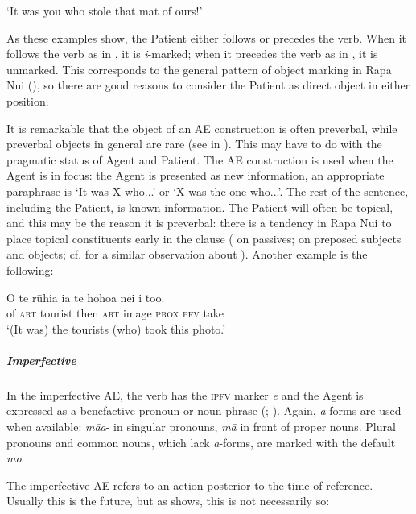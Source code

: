\glt
‘It was you who stole that mat of ours!’ \textstyleExampleref{[R310.428]} 
\z

As these examples show, the Patient either follows or precedes the verb. When it follows the verb as in , it is \textit{i}{}-marked; when it precedes the verb as in , it is unmarked. This corresponds to the general pattern of object marking in Rapa Nui (), so there are good reasons to consider the Patient as direct object in either position.

It is remarkable that the object of an AE construction is often preverbal, while preverbal objects in general are rare (see  in ). This may have to do with the pragmatic status of Agent and Patient. The AE construction is used when the Agent is in focus: the Agent is presented as new information, an appropriate paraphrase is ‘It was X who...’ or ‘X was the one who...’. The rest of the sentence, including the Patient, is known information. The Patient will often be topical, and this may be the reason it is preverbal: there is a tendency in Rapa Nui to place topical constituents early in the clause ( on passives;  on preposed subjects and objects; cf. \citet[68]{PotsdamPolinsky2012} for a similar observation about ). Another example is the following: 

\ea\label{ex:8.98}
\gll O te rūhia ia te hoho{\ꞌ}a nei i to{\ꞌ}o. \\
of \textsc{art} tourist then \textsc{art} image \textsc{prox} \textsc{pfv} take \\

\glt 
‘(It was) the tourists (who) took this photo.’ \textstyleExampleref{[R415.735]} 
\z

\subparagraph{Imperfective} In the imperfective AE, the verb has the \textsc{ipfv} marker \textit{e} and the Agent is expressed as a benefactive pronoun or noun phrase (; ). Again, \textit{a}{}-forms are used when available: \textit{mā{\ꞌ}a}{}- in singular pronouns, \textit{mā} in front of proper nouns. Plural pronouns and common nouns, which lack \textit{a}{}-forms, are marked with the default \textit{mo}. 

The imperfective AE refers to an action posterior to the time of reference. Usually this is the future, but as  shows, this is not necessarily so:

